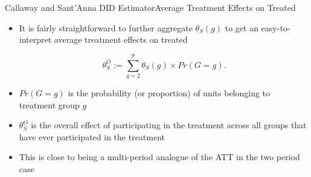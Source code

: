 \documentclass[dvipsnames,hyperref={pdfpagelabels=false}]{beamer}
\begin{document}
\begin{frame}{Callaway and Sant'Anna DID Estimator}{Average Treatment Effects on Treated}
	\begin{itemize}
		
		\item[2] It is fairly straightforward to further aggregate $\theta_S(g)$ to get an easy-to-interpret average treatment effects on treated
		
		\begin{equation*}
			\theta^O_S := \sum_{g=2}^{\mathcal{T}} \theta_S(g) \times Pr(G=g).
		\end{equation*}
		
		\item $Pr(G=g)$ is the probability (or proportion) of units belonging to treatment group $g$
				\vspace{0.2cm}
		
		\item $\theta^O_S$ is the overall effect of participating in the treatment across all groups that have ever participated in the treatment
		\vspace{0.2cm}
	    \item This is close to being a multi-period analogue of the ATT
	in the two period case
	
		
		
	\end{itemize}
\end{frame}



%
%		
%
%		
%		
%    
%  
\end{document}
